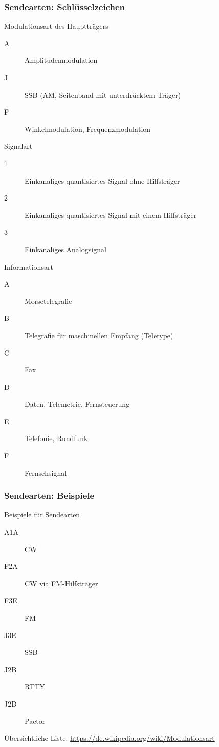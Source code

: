 \begin{frame}[allowframebreaks]
  \frametitle{Sendearten: Schlüsselzeichen}

  \begin{block}{Modulationsart des Hauptträgers}
    \begin{description}
      \item[A] Amplitudenmodulation
      \item[J] SSB (AM, Seitenband mit unterdrücktem Träger)
      \item[F] Winkelmodulation, Frequenzmodulation
    \end{description}
  \end{block}

  \begin{block}{Signalart}
    \begin{description}
      \item[1] Einkanaliges quantisiertes Signal ohne Hilfsträger
      \item[2] Einkanaliges quantisiertes Signal mit einem Hilfsträger
      \item[3] Einkanaliges Analogsignal
    \end{description}
  \end{block}

  \begin{block}{Informationsart}
    \begin{description}
      \item[A] Morsetelegrafie
      \item[B] Telegrafie für maschinellen Empfang (Teletype)
      \item[C] Fax
      \item[D] Daten, Telemetrie, Fernsteuerung
      \item[E] Telefonie, Rundfunk
      \item[F] Fernsehsignal
    \end{description}
  \end{block}

\end{frame}

\begin{frame}
  \frametitle{Sendearten: Beispiele}

  \begin{exampleblock}{Beispiele für Sendearten}
    \begin{description}
      \item[A1A] CW
      \item[F2A] CW via FM-Hilfsträger
      \item[F3E] FM
      \item[J3E] SSB
      \item[J2B] RTTY
      \item[J2B] Pactor
    \end{description}
  \end{exampleblock}

  Übersichtliche Liste: \ExternalLink\url{https://de.wikipedia.org/wiki/Modulationsart}

\end{frame}


